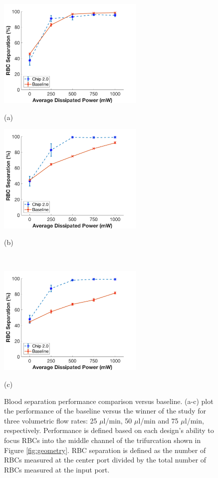 \begin{figure}[H]
  \begin{minipage}[t]{0.49\linewidth}\centering
    \includegraphics[width=7cm]{ErrorBarBloodData25ul}
    \medskip
    \centerline{(a)}
  \end{minipage}\hfill
  \begin{minipage}[t]{0.49\linewidth}\centering
    \includegraphics[width=7cm]{ErrorBarBloodData50ul}
    \medskip
    \centerline{(b)}\\
  \end{minipage}
  \begin{minipage}[t]{0.99\linewidth}\centering
    \includegraphics[width=7cm]{ErrorBarBloodData75ul}
    \medskip
    \centerline{(c)}
  \end{minipage}
  \caption[Separation Performance Comparison Versus Baseline]{Blood separation performance comparison versus baseline. (a-c) plot the performance of the baseline versus the winner of the study for three volumetric flow rates: 25 $\mu$l/min, 50 $\mu$l/min and 75 $\mu$l/min, respectively. Performance is defined based on each design's ability to focus RBCs into the middle channel of the trifurcation shown in Figure \ref{fig:geometry}. RBC separation is defined as the number of RBCs measured at the center port divided by the total number of RBCs measured at the input port.}
	\label{fig:headToHeadBlood}
\end{figure}

